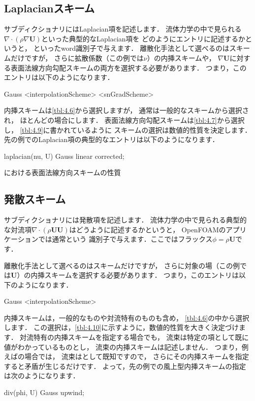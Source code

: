 \subsection{Laplacianスキーム}
\label{ssec:4.4.4}
サブディクショナリにはLaplacian項を記述します．
流体力学の中で見られる$\nabla \cdot (\rho\nabla\bm{U})$といった典型的なLaplacian項を
どのようにエントリに記述するかというと，
といったword識別子で与えます．
離散化手法として選べるのはスキームだけですが，
さらに拡散係数（この例では$\nu$）の内挿スキームや，
$\nabla\bm{U}$に対する表面法線方向勾配スキームの両方を選択する必要があります．
つまり，このエントリは以下のようになります．
\begin{OFverbatim}[file]
Gauss <interpolationScheme> <snGradScheme>
\end{OFverbatim}
内挿スキームは\autoref{tbl:4.6}から選択しますが，
通常は一般的なスキームから選択され，
ほとんどの場合にします．
表面法線方向勾配スキームは\autoref{tbl:4.7}から選択し，
\autoref{tbl:4.9}に書かれているように
スキームの選択は数値的性質を決定します．
先の例でのLaplacian項の典型的なエントリは以下のようになります．
\begin{OFverbatim}[file]
laplacian(nu, U) Gauss linear corrected;
\end{OFverbatim}


\begin{table}[ht]
 
 \caption{における表面法線方向スキームの性質}
 \label{tbl:4.9}
\end{table}


\subsection{発散スキーム}
\label{ssec:4.4.5}
サブディクショナリには発散項を記述します．
流体力学の中で見られる典型的な対流項$\nabla \cdot (\rho\bm{U}\bm{U})$はどうように記述するかというと，
OpenFOAMのアプリケーションでは通常という
識別子で与えます．ここではフラックス$\phi = \rho\bm{U}$です．

離散化手法として選べるのはスキームだけですが，
さらに対象の場（この例では$\bm{U}$）の内挿スキームを選択する必要があります．
つまり，このエントリは以下のようになります．
\begin{OFverbatim}[file]
Gauss <interpolationScheme>
\end{OFverbatim}
内挿スキームは，一般的なものや対流特有のものも含め，
\autoref{tbl:4.6}の中から選択します．
この選択は，\autoref{tbl:4.10}に示すように，数値的性質を大きく決定づけます．
対流特有の内挿スキームを指定する場合でも，
流束は特定の項として既に値がわかっているものとし，
流束の内挿スキームは記述しません．
つまり，例えばの場合では，
流束はとして既知ですので，
さらにその内挿スキームを指定すると矛盾が生じるだけです．
よって，先の例での風上型内挿スキームの指定は次のようになります．
\begin{OFverbatim}[file]
div(phi, U) Gauss upwind;
\end{OFverbatim}


